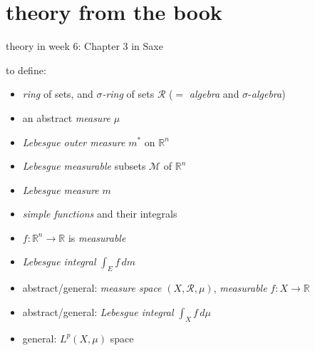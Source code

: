 \documentclass[10pt,
               svgnames,
               hyperref={colorlinks,
                         citecolor=DeepPink4,
                         linkcolor=FireBrick,
                         urlcolor=blue},
               usepdftitle=false]{beamer}
\newcommand{\cM}{\mathcal{M}}
\newcommand{\cR}{\mathcal{R}}
\newcommand{\RR}{\mathbb{R}}
\begin{document}
\section{theory from the book}

\begin{frame}{theory in week 6: Chapter 3 in Saxe}

\begin{block}{to define:}
\begin{itemize}
\item \emph{ring} of sets, and \emph{$\sigma$-ring} of sets $\cR$ \hfill ($=$ \emph{algebra} and $\sigma$-\emph{algebra})
\item an abstract \emph{measure} $\mu$
\item \emph{Lebesgue outer measure} $m^*$ on $\RR^n$
\item \emph{Lebesgue measurable} subsets $\cM$ of $\RR^n$
\item \emph{Lebesgue measure} $m$
\item \emph{simple functions} and their integrals
\item $f:\RR^n\to \RR$ is \emph{measurable}
\item \emph{Lebesgue integral} $\int_E f\,dm$
\item abstract/general: \emph{measure space} $(X,\cR,\mu)$, \emph{measurable} $f:X\to \RR$
\item abstract/general: \emph{Lebesgue integral} $\int_X f\,d\mu$
\item general: $L^p(X,\mu)$ space
\end{itemize}
\end{block}
\end{frame}
\end{document}
